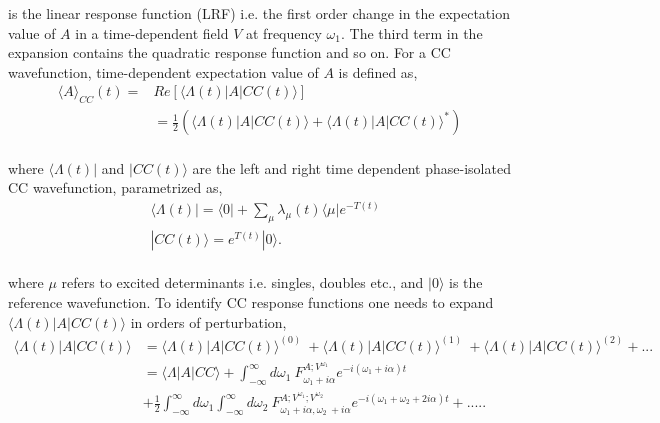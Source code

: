 is the linear response function (LRF) i.e. the first order change in the expectation value of 
$A$ in a time-dependent field $V$ at frequency $\omega_1$. The third term in the expansion
contains the quadratic response function and so on. For a CC wavefunction, time-dependent 
expectation value of $A$ is defined as\cite{revisited},
\begin{equation}
\begin{split}
{\langle A \rangle}_{CC} (t) = & Re [\langle \Lambda(t) | A | CC(t)\rangle ]\\
& = \frac{1}{2} (\langle \Lambda(t) | A | CC(t)\rangle  + {\langle \Lambda(t) | A | CC(t)\rangle}^{*})
\end{split}
\end{equation}
\\
where $\langle \Lambda(t)|$ and $|CC(t)\rangle$ are the left and right time dependent 
phase-isolated CC wavefunction, parametrized as,
\begin{equation}
\begin{split}
&  \langle \Lambda(t) |  = \langle 0 | + \sum_{\mu}\lambda_{\mu}(t)\langle \mu|e^{-T(t)} \\
& |CC(t)\rangle = e^{T(t)}|0\rangle.
\end{split}
\end{equation}
\\
where $\mu$ refers to excited determinants i.e. singles, doubles etc.,
and $|0\rangle$ is the reference wavefunction. To identify CC response 
functions one needs to expand $\langle \Lambda(t) | A | CC(t)\rangle$ 
in orders of perturbation\cite{Revisited},
\begin{equation}
\begin{split}
\langle \Lambda(t) | A | CC(t) \rangle & = {\langle \Lambda(t) | A | CC(t) \rangle}^{(0)}\
 + {\langle \Lambda(t) | A | CC(t) \rangle}^{(1)} \
+ {\langle \Lambda(t) | A | CC(t) \rangle}^{(2)} + ... \\
& = \langle \Lambda | A | CC \rangle + \int_{-\infty}^{\infty}d\omega_1 \
F^{A;V^{\omega_1}}_{\omega_1 + i\alpha}e^{-i(\omega_1 + i\alpha)t} \\
& + \frac{1}{2} \int_{-\infty}^{\infty}d\omega_1\int_{-\infty}^{\infty}d\omega_2\
F^{A;V^{\omega_1};V^{\omega_2}}_{\omega_1 + i\alpha,\omega_2 \
+ i\alpha}e^{-i(\omega_1 + \omega_2 + 2i\alpha)t} + .....
\end{split}
\end{equation}
